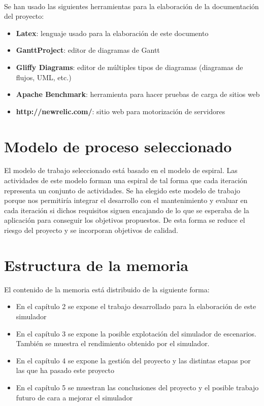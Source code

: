 \\

Se han usado las siguientes herramientas para la elaboración de la documentación del proyecto:

\begin{itemize}
       \item {\bfseries Latex}: lenguaje usado para la elaboración de este documento
       \item {\bfseries GanttProject}: editor de diagramas de Gantt
       \item {\bfseries Gliffy Diagrams}: editor de múltiples tipos de diagramas (diagramas de flujos, UML, etc.)
       \item {\bfseries Apache Benchmark}: herramienta para hacer pruebas de carga de sitios web
       \item {\bfseries http://newrelic.com/}: sitio web para motorización de servidores
\end{itemize}


\section{Modelo de proceso seleccionado}

El modelo de trabajo seleccionado está basado en el modelo de espiral. Las actividades de este modelo forman una espiral de tal forma que cada iteración representa un conjunto de actividades. Se ha elegido este modelo de trabajo porque nos permitiría integrar el desarrollo con el mantenimiento y evaluar en cada iteración si dichos requisitos siguen encajando de lo que se esperaba de la aplicación para conseguir los objetivos propuestos. De esta forma se reduce el riesgo del proyecto y se incorporan objetivos de calidad.

\section{Estructura de la memoria}

El contenido de la memoria está distribuido de la siguiente forma:

\begin{itemize}
       \item En el capítulo 2 se expone el trabajo desarrollado para la elaboración de este simulador
       \item En el capítulo 3 se expone la posible explotación del simulador de escenarios. También se muestra el rendimiento obtenido por el simulador.
       \item En el capítulo 4 se expone la gestión del proyecto y las distintas etapas por las que ha pasado este proyecto
       \item En el capítulo 5 se muestran las conclusiones del proyecto y el posible trabajo futuro de cara a mejorar el simulador 
\end{itemize}

